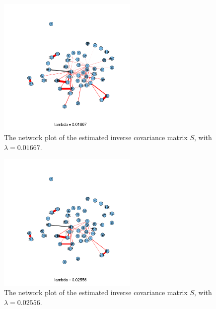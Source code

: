\documentclass[11pt]{article}
\newcommand{\1}[1]{{\mathbf 1}\left\{#1\right\}}        %
\begin{document}
\begin{center}
\begin{figure}[!h]
   \centering
   \includegraphics[width=0.6\textwidth]{../gLassoResults/glasso4.png} 
      \caption{The network plot of the estimated inverse covariance matrix $S$, with $\lambda = 0.01667$.}
   \label{fig:glasso4}
\end{figure}
\end{center}

\begin{center}
\begin{figure}[!h]
   \centering
   \includegraphics[width=0.6\textwidth]{../gLassoResults/glasso5.png} 
      \caption{The network plot of the estimated inverse covariance matrix $S$, with $\lambda = 0.02556$.}
   \label{fig:glasso5}
\end{figure}
\end{center}
\end{document}

